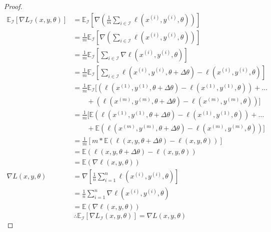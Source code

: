 \documentclass[a4paper]{article}
\begin{document}
\begin{proof}
    \begin{align*}
        \mathbb{E}_\mathcal{I}[\nabla L_{\mathcal{I}}(x,y,\theta)]&=\mathbb{E}_\mathcal{I}[\nabla(\frac{1}{m}\sum_{i\in\mathcal{I}}\ell(x^{(i)},y^{(i)},\theta))]\\
        &=\frac{1}{m}\mathbb{E}_\mathcal{I}[\nabla(\sum_{i\in\mathcal{I}}\ell(x^{(i)},y^{(i)},\theta))]\\
        &=\frac{1}{m}\mathbb{E}_\mathcal{I}[\sum_{i\in\mathcal{I}}\nabla\ell(x^{(i)},y^{(i)},\theta)]\\
        &=\frac{1}{m}\mathbb{E}_\mathcal{I}[\sum_{i\in\mathcal{I}}\ell(x^{(i)},y^{(i)},\theta+\Delta\theta)-\ell(x^{(i)},y^{(i)},\theta)]\\
        &=\frac{1}{m}\mathbb{E}_\mathcal{I}[(\ell(x^{(1)},y^{(1)},\theta+\Delta\theta)-\ell(x^{(1)},y^{(1)},\theta))+\dots\\&\qquad+(\ell(x^{(m)},y^{(m)},\theta+\Delta\theta)-\ell(x^{(m)},y^{(m)},\theta))]\\
        &=\frac{1}{m}[\mathbb{E}(\ell(x^{(1)},y^{(1)},\theta+\Delta\theta)-\ell(x^{(1)},y^{(1)},\theta))+\dots\\&\qquad+\mathbb{E}(\ell(x^{(m)},y^{(m)},\theta+\Delta\theta)-\ell(x^{(m)},y^{(m)},\theta))]\\
        &=\frac{1}{m}[m*\mathbb{E}(\ell(x,y,\theta+\Delta\theta)-\ell(x,y,\theta))]\\
        &=\mathbb{E}(\ell(x,y,\theta+\Delta\theta)-\ell(x,y,\theta))\\
        &=\mathbb{E}(\nabla\ell(x,y,\theta))\\
        \nabla L(x,y,\theta)&=\nabla[\frac{1}{n}\sum_{i=1}^n\ell(x^{(i)},y^{(i)},\theta)]\\
        &=\frac{1}{n}\sum_{i=1}^n\nabla\ell(x^{(i)},y^{(i)},\theta)\\
        &=\mathbb{E}(\nabla\ell(x,y,\theta))
    \end{align*}
    \begin{equation*}
        \therefore\mathbb{E}_\mathcal{I}[\nabla L_{\mathcal{I}}(x,y,\theta)]=\nabla L(x,y,\theta)
    \end{equation*}
\end{proof}



\end{document}

